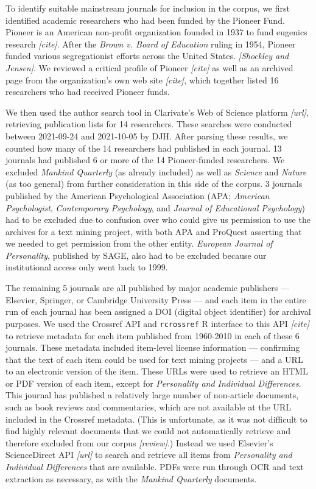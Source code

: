 \documentclass[12pt]{article}
\begin{document}
To identify suitable mainstream journals for inclusion in the corpus, we
first identified academic researchers who had been funded by the Pioneer
Fund. Pioneer is an American non-profit organization founded in 1937 to
fund eugenics research \emph{{[}cite{]}}. After the \emph{Brown v. Board
of Education} ruling in 1954, Pioneer funded various segregationist
efforts across the United States. \emph{{[}Shockley and Jensen{]}}. We
reviewed a critical profile of Pioneer \emph{{[}cite{]}} as well as an
archived page from the organization's own web site \emph{{[}cite{]}},
which together listed 16 researchers who had received Pioneer funds.

We then used the author search tool in Clarivate's Web of Science
platform \emph{{[}url{]}}, retrieving publication lists for 14
researchers. These searches were conducted between 2021-09-24 and
2021-10-05 by DJH. After parsing these results, we counted how many of
the 14 researchers had published in each journal. 13 journals had
published 6 or more of the 14 Pioneer-funded researchers. We excluded
\emph{Mankind Quarterly} (as already included) as well as \emph{Science}
and \emph{Nature} (as too general) from further consideration in this
side of the corpus. 3 journals published by the American Psychological
Association (APA; \emph{American Psychologist}, \emph{Contemporary
Psychology}, and \emph{Journal of Educational Psychology}) had to be
excluded due to confusion over who could give us permission to use the
archives for a text mining project, with both APA and ProQuest asserting
that we needed to get permission from the other entity. \emph{European
Journal of Personality}, published by SAGE, also had to be excluded
because our institutional access only went back to 1999.

The remaining 5 journals are all published by major academic publishers
--- Elsevier, Springer, or Cambridge University Press --- and each item
in the entire run of each journal has been assigned a DOI (digital
object identifier) for archival purposes. We used the Crossref API and
\texttt{rcrossref} R interface to this API \emph{{[}cite{]}} to retrieve
metadata for each item published from 1960-2010 in each of these 6
journals. These metadata included item-level license information ---
confirming that the text of each item could be used for text mining
projects --- and a URL to an electronic version of the item. These URLs
were used to retrieve an HTML or PDF version of each item, except for
\emph{Personality and Individual Differences}. This journal has
published a relatively large number of non-article documents, such as
book reviews and commentaries, which are not available at the URL
included in the Crossref metadata. (This is unfortunate, as it was not
difficult to find highly relevant documents that we could not
automatically retrieve and therefore excluded from our corpus
\emph{{[}review{]}}.) Instead we used Elsevier's ScienceDirect API
\emph{{[}url{]}} to search and retrieve all items from \emph{Personality
and Individual Differences} that are available. PDFs were run through
OCR and text extraction as necessary, as with the \emph{Mankind
Quarterly} documents.
\end{document}
